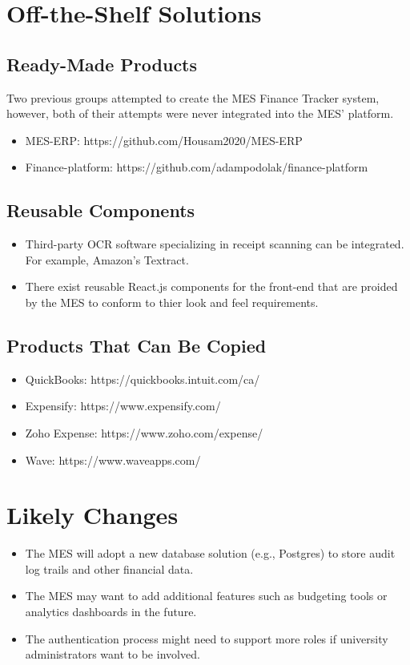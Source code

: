 \documentclass[12pt]{article}
\begin{document}
\section{Off-the-Shelf Solutions}
  \subsection{Ready-Made Products}
  Two previous groups attempted to create the MES Finance Tracker system, however, both of their attempts were never integrated into the MES' platform.  
  \begin{itemize}
      \item MES-ERP: https://github.com/Housam2020/MES-ERP
      \item Finance-platform: https://github.com/adampodolak/finance-platform
    \end{itemize}

  \subsection{Reusable Components}
    \begin{itemize}
      \item Third-party OCR software specializing in receipt scanning can be integrated. For example, Amazon's Textract.
      \item There exist reusable React.js components for the front-end that are proided by the MES to conform to thier look and feel requirements.
    \end{itemize}

  \subsection{Products That Can Be Copied}
    \begin{itemize}
      \item QuickBooks: https://quickbooks.intuit.com/ca/
      \item Expensify: https://www.expensify.com/
      \item Zoho Expense: https://www.zoho.com/expense/
      \item Wave: https://www.waveapps.com/
    \end{itemize}

\section{Likely Changes}
  \begin{itemize}
    \item The MES will adopt a new database solution (e.g., Postgres) to store audit log trails and other financial data.
    \item The MES may want to add additional features such as budgeting tools or analytics dashboards in the future.
    \item The authentication process might need to support more roles if university administrators want to be involved.
  \end{itemize}    
\end{document}
